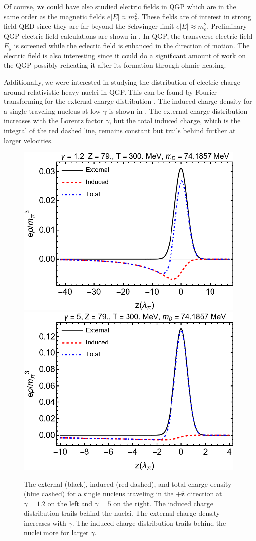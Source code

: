 Of course, we could have also studied electric fields in QGP which are in the same order as the magnetic fields $e|E| \approx m_\pi^2$. These fields are of interest in strong field QED since they are far beyond the Schwinger limit $e|E| \approx m_e^2$. Preliminary QGP electric field calculations are shown in 
. In QGP, the transverse electric field $E_y$ is screened while the eclectic field is enhanced in the direction of motion. The electric field is also interesting since it could do a significant amount of work on the QGP possibly reheating it after its formation through ohmic heating. 

Additionally, we were interested in studying the distribution of electric charge around relativistic heavy nuclei in QGP. This can be found by Fourier transforming  for the external charge distribution . The induced charge density for a single traveling nucleus at low $\gamma$ is shown in . The external charge distribution increases with the Lorentz factor $\gamma$, but the total induced charge, which is the integral of the red dashed line, remains constant but trails behind further at larger velocities.

\phantom{Phantom text}
\begin{figure}[h!]
\centering
\includegraphics[width=0.45\linewidth]{plots/chap02QCD/indchg12.png}
\hspace{0.05\linewidth}
\includegraphics[width=0.45\linewidth]{plots/chap02QCD/indchg5.png}
\caption{The external (black), induced (red dashed), and total charge density (blue dashed) for a single nucleus traveling in the $+\boldsymbol{\hat{z}}$ direction at $\gamma = 1.2$ on the left and $\gamma = 5$ on the right. The induced charge distribution trails behind the nuclei. The external charge density increases with $\gamma$. The induced charge distribution trails behind the nuclei more for larger $\gamma$. \label{fig:potcomp}}
\end{figure}

